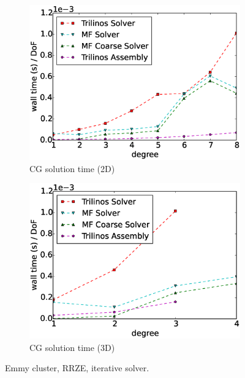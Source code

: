 \documentclass[preprint,12pt,times]{elsarticle}
\begin{document}
\begin{figure}[!ht]
\begin{subfigure}[b]{0.49\textwidth}
    \includegraphics[width=\textwidth]{Emmy_RRZE_solver2d.eps}
    \caption{CG solution time (2D)}
    \label{fig:benchmark_miehe_Emmy_sol2}
  \end{subfigure}
  \begin{subfigure}[b]{0.49\textwidth}
    \centering
    \includegraphics[width=\textwidth]{Emmy_RRZE_solver3d.eps}
    \caption{CG solution time (3D)}
    \label{fig:benchmark_miehe_Emmy_sol3}
  \end{subfigure}
  \caption{Emmy cluster, RRZE, iterative solver.}%
  \label{fig:benchmark_miehe_Emmy_cg}
\end{figure}
\end{document}
